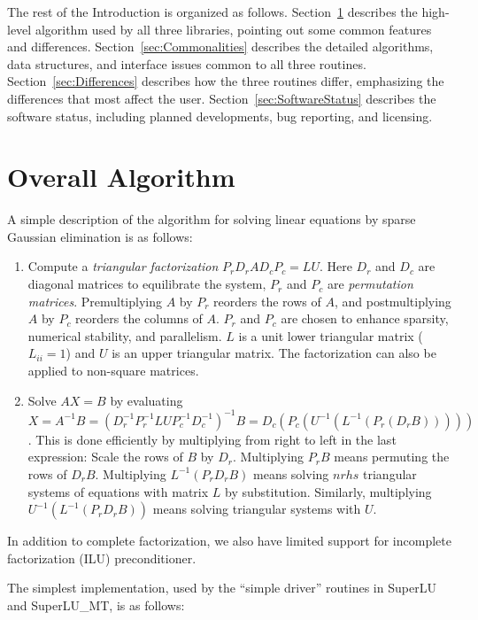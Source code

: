 The rest of the Introduction is organized as follows.
Section~\ref{sec:OverallAlgorithm} describes the high-level algorithm used
by all three libraries, pointing out some common features and differences.
Section~\ref{sec:Commonalities} describes the detailed algorithms, 
data structures, and interface issues common to all three routines.
Section~\ref{sec:Differences} describes how the three routines differ,
emphasizing the differences that most affect the user.
Section~\ref{sec:SoftwareStatus} describes the software status,
including planned developments, bug reporting, and licensing.

\section{Overall Algorithm}
\label{sec:OverallAlgorithm}

A simple description of the algorithm for solving linear equations by
sparse Gaussian elimination is as follows:
\begin{enumerate}
\item Compute a {\em triangular factorization} $P_r D_r A D_c P_c = L U$.
  Here $D_r$ and $D_c$ are diagonal matrices to equilibrate the system,
  $P_r$ and $P_c$ are {\em permutation matrices}. Premultiplying $A$ by
  $P_r$ reorders the rows of $A$, and postmultiplying $A$ by $P_c$ reorders
  the columns of $A$. $P_r$ and $P_c$ are chosen to enhance sparsity,
  numerical stability, and parallelism. $L$ is a unit lower triangular matrix
  ($L_{ii}=1$) and $U$ is an upper triangular matrix.
  The factorization can also be applied to non-square matrices.
\item Solve $AX=B$ by evaluating 
  $X = A^{-1}B = (D_r^{-1}P_r^{-1}LUP_c^{-1}D_c^{-1})^{-1} B
   = D_c (P_c(U^{-1}(L^{-1}(P_r (D_r B)))))$.
  This is done efficiently by multiplying from right to left in the last
  expression: Scale the rows of $B$ by $D_r$.
  Multiplying $P_rB$ means permuting the rows of $D_r B$.
  Multiplying $L^{-1}(P_r D_r B)$ means solving $nrhs$ triangular systems
  of equations with matrix $L$ by substitution. Similarly, multiplying
  $U^{-1}(L^{-1}(P_r D_r B))$ means solving triangular systems with $U$.
\end{enumerate}

In addition to complete factorization, we also have limited support
for incomplete factorization (ILU) preconditioner.

The simplest implementation, used by the ``simple driver'' routines in
SuperLU and SuperLU\_MT, is as follows:


